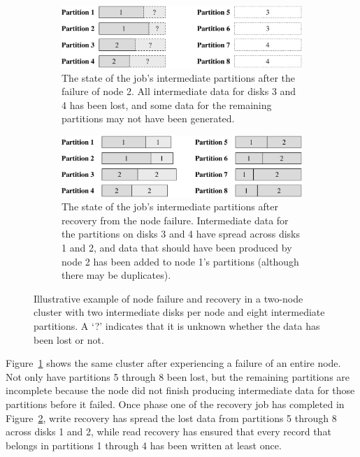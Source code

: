 \begin{figure}[t]
  \centering
  \begin{subfigure}[t]{\columnwidth}
    \centering
    \includegraphics[width=\textwidth]{fault_tolerance/figures/node_failure_before_recovery}
    \caption{\label{fig:node_fail_before} The state of the job's intermediate
      partitions after the failure of node 2. All intermediate data for disks 3
      and 4 has been lost, and some data for the remaining partitions may not
      have been generated.}
  \end{subfigure}\hspace{0.05\textwidth}
  \begin{subfigure}[t]{\columnwidth}
    \centering
    \includegraphics[width=\textwidth]{fault_tolerance/figures/node_failure_after_recovery}
    \caption{\label{fig:node_fail_after} The state of the job's intermediate
      partitions after recovery from the node failure. Intermediate data for
      the partitions on disks 3 and 4 have spread across disks 1 and 2, and
      data that should have been produced by node 2 has been added to node 1's
      partitions (although there may be duplicates).}
  \end{subfigure}
  \caption{\label{fig:node_fail} Illustrative example of node failure and
    recovery in a two-node cluster with two intermediate disks per node and
    eight intermediate partitions. A `?' indicates that it is unknown
    whether the data has been lost or not.}
\end{figure}

Figure~\ref{fig:node_fail_before} shows the same cluster after experiencing a
failure of an entire node. Not only have partitions 5 through 8 been lost, but
the remaining partitions are incomplete because the node did not finish
producing intermediate data for those partitions before it failed. Once phase
one of the recovery job has completed in Figure~\ref{fig:node_fail_after},
write recovery has spread the lost data from partitions 5 through 8 across
disks 1 and 2, while read recovery has ensured that every record that belongs
in partitions 1 through 4 has been written at least once.

